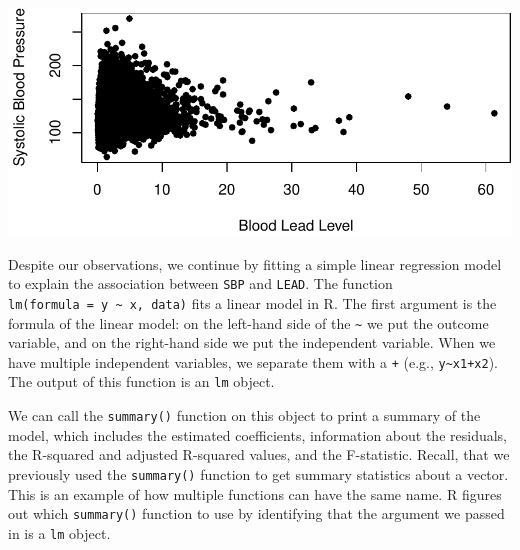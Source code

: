 \documentclass[
  letterpaper,
]{latex/krantz}
\begin{document}
\begin{center}
\includegraphics[width=1\textwidth,height=\textheight]{book/linear_regression_files/figure-pdf/unnamed-chunk-4-1.pdf}
\end{center}

Despite our observations, we continue by fitting a simple linear
regression model to explain the association between \texttt{SBP} and
\texttt{LEAD}. The function
\texttt{lm(formula\ =\ y\ \textasciitilde{}\ x,\ data)}
fits a linear model in R. The first argument is the formula of the
linear model: on the left-hand side of the \texttt{\textasciitilde{}} we
put the outcome variable, and on the right-hand side we put the
independent variable. When we have multiple independent variables, we
separate them with a \texttt{+} (e.g.,
\texttt{y\textasciitilde{}x1+x2}). The output of this function is an
\texttt{lm} object.

We can call the
\texttt{summary()}
function on this object to print a summary of the
model, which includes the
estimated coefficients, information about the residuals, the R-squared
and adjusted R-squared values, and the F-statistic. Recall, that we
previously used the \texttt{summary()} function to get summary
statistics about a vector. This is an example of how multiple functions
can have the same name. R figures out which \texttt{summary()} function
to use by identifying that the argument we passed in is a \texttt{lm}
object.
\end{document}
